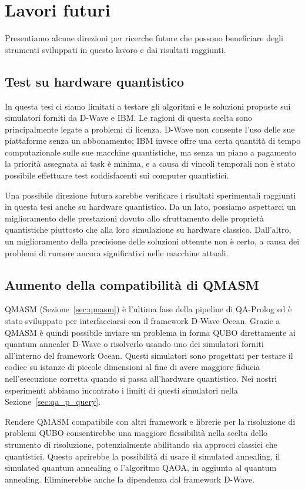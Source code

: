 \section{Lavori futuri}
Presentiamo alcune direzioni per ricerche future che possono beneficiare degli strumenti sviluppati in questo lavoro e dai risultati raggiunti.
\subsection{Test su hardware quantistico}
In questa tesi ci siamo limitati a testare gli algoritmi e le soluzioni proposte sui simulatori forniti da D-Wave e IBM. Le ragioni di questa scelta sono principalmente legate a problemi di licenza. D-Wave non consente l'uso delle sue piattaforme senza un abbonamento; IBM invece offre una certa quantità di tempo computazionale sulle sue macchine quantistiche, ma senza un piano a pagamento la priorità assegnata ai task è minima, e a causa di vincoli temporali non è stato possibile effettuare test soddisfacenti sui computer quantistici.

Una possibile direzione futura sarebbe verificare i risultati sperimentali raggiunti in questa tesi anche su hardware quantistico. Da un lato, possiamo aspettarci un miglioramento delle prestazioni dovuto allo sfruttamento delle proprietà quantistiche piuttosto che alla loro simulazione su hardware classico. Dall'altro, un miglioramento della precisione delle soluzioni ottenute non è certo, a causa dei problemi di rumore ancora significativi nelle macchine attuali.

\subsection{Aumento della compatibilità di QMASM}
QMASM (Sezione~\ref{sec:qmasm}) è l'ultima fase della pipeline di QA-Prolog ed è stato sviluppato per interfacciarsi con il framework D-Wave Ocean. Grazie a QMASM è quindi possibile inviare un problema in forma QUBO direttamente ai quantum annealer D-Wave o risolverlo usando uno dei simulatori forniti all'interno del framework Ocean. Questi simulatori sono progettati per testare il codice su istanze di piccole dimensioni al fine di avere maggiore fiducia nell'esecuzione corretta quando si passa all'hardware quantistico. Nei nostri esperimenti abbiamo incontrato i limiti di questi simulatori nella Sezione~\ref{sec:qa_p_query}.

Rendere QMASM compatibile con altri framework e librerie per la risoluzione di problemi QUBO consentirebbe una maggiore flessibilità nella scelta dello strumento di risoluzione, potenzialmente abilitando sia approcci classici che quantistici. Questo aprirebbe la possibilità di usare il simulated annealing, il simulated quantum annealing o l'algoritmo QAOA, in aggiunta al quantum annealing. Eliminerebbe anche la dipendenza dal framework D-Wave.

